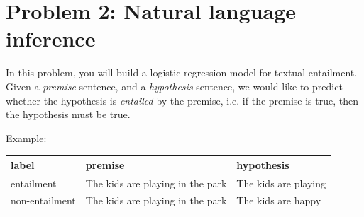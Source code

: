 \documentclass{article}
\theoremstyle{case}
\theoremstyle{definition}
\begin{document}
\section*{Problem 2: Natural language inference}
In this problem, you will build a logistic regression model for textual entailment.
Given a \textit{premise} sentence,
and a \textit{hypothesis} sentence,
we would like to predict whether the hypothesis is \textit{entailed} by the premise,
i.e. if the premise is true, then the hypothesis must be true.

Example:
\begin{center}
    \begin{tabular}{lll}
        label & premise & hypothesis \\
        \hline
        entailment & The kids are playing in the park & The kids are playing \\
        non-entailment &The kids are playing in the park & The kids are happy 
    \end{tabular}
\end{center}
\end{document}
